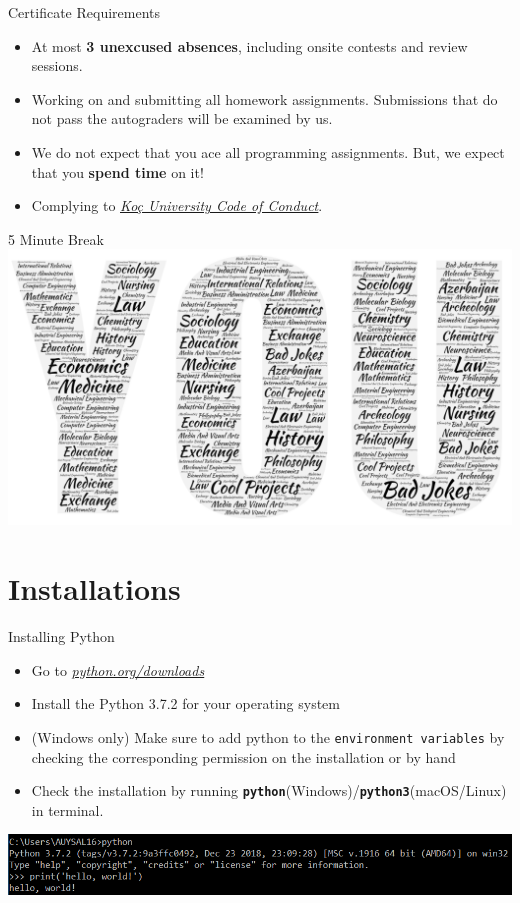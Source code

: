 		\begin{frame}{Certificate Requirements}
			\pause
			\begin{itemize}
				\LARGE
				\item At most \textbf{3 unexcused absences}, including onsite contests and review sessions.
				\pause
				\item Working on and submitting all homework assignments. Submissions that do not pass the autograders will be examined by us.
				\pause
				\item We do not expect that you ace all programming assignments. But, we expect that you \textbf{spend time} on it!
				\pause
				\item Complying to \href{https://vpaa.ku.edu.tr/academic/student-code-of-conduct}{\underline{\textit{Koç University Code of Conduct}}}. 
			\end{itemize}
		\end{frame}


		\begin{frame}{5 Minute Break}
			\centering
			\includegraphics[width=\textwidth]{images/you_wordart.PNG}
		\end{frame}

	\section{Installations}

	 	\begin{frame}{Installing Python}
			\LARGE
			\begin{itemize}
				\item Go to \href{https://www.python.org/downloads/}{\underline{\textit{python.org/downloads}}}
				\pause
				\item Install the Python 3.7.2 for your operating system
				\pause
				\item (Windows only) Make sure to add python to the \texttt{environment variables} by checking the corresponding permission on the installation or by hand
				\pause
				\item Check the installation by running \textbf{\texttt{python}}(Windows)/\textbf{\texttt{python3}}(macOS/Linux) in terminal.
			\end{itemize}
			\includegraphics[width=\textwidth]{images/cmd_helloworld.PNG}
		\end{frame}
		 
